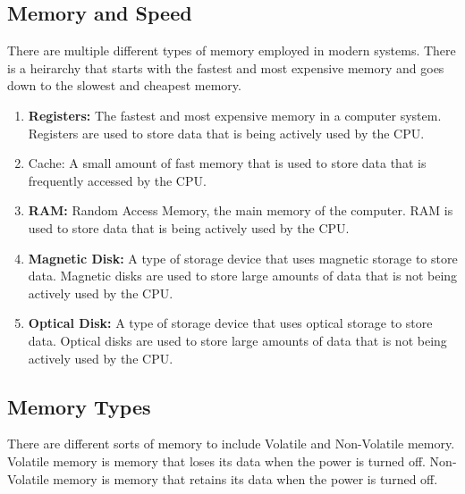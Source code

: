 \documentclass[12pt]{article}
\begin{document}
\subsection{Memory and Speed}
There are multiple different types of memory employed in modern systems.
There is a heirarchy that starts with the fastest and most expensive
memory and goes down to the slowest and cheapest memory.
\begin{enumerate}
	\item \textbf{Registers:} The fastest and most expensive memory in a
	      computer system. Registers are used to store data that is
	      being actively used by the CPU.
	\item Cache: A small amount of fast memory that is used to store
	      data that is frequently accessed by the CPU.
	\item \textbf{RAM:} Random Access Memory, the main memory of the
	      computer. RAM is used to store data that is being actively
	      used by the CPU.
	\item \textbf{Magnetic Disk:} A type of storage device that uses
	      magnetic storage to store data. Magnetic disks are used to
	      store large amounts of data that is not being actively used
	      by the CPU.
	\item \textbf{Optical Disk:} A type of storage device that uses
	      optical storage to store data. Optical disks are used to
	      store large amounts of data that is not being actively used
	      by the CPU.
\end{enumerate}
\subsection{Memory Types}
There are different sorts of memory to include Volatile and Non-Volatile
memory. Volatile memory is memory that loses its data when the power is 
turned off. Non-Volatile memory is memory that retains its data when the
power is turned off.
\end{document}
